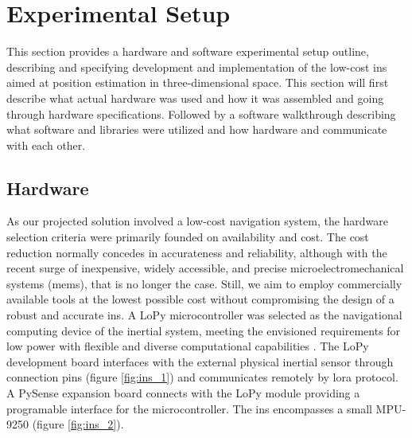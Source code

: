 \section{Experimental Setup}

This section provides a hardware and software experimental setup outline, describing and specifying development and implementation of the low-cost \acrfull{ins} aimed at position estimation in three-dimensional space. This section will first describe what actual hardware was used and how it was assembled and going through hardware specifications. Followed by a software walkthrough describing what software and libraries were utilized and how hardware and communicate with each other.

\subsection{Hardware}
\label{sub:setup}

As our projected solution involved a low-cost navigation system, the hardware selection criteria were primarily founded on availability and cost. The cost reduction normally concedes in accurateness and reliability, although with the recent surge of inexpensive, widely accessible, and precise microelectromechanical systems (\acrshort{mems}), that is no longer the case. Still, we aim to employ commercially available tools at the lowest possible cost without compromising the design of a robust and accurate \acrfull{ins}. A LoPy microcontroller was selected as the navigational computing device of the inertial system, meeting the envisioned requirements for low power with flexible and diverse computational capabilities \cite{lopy}. The LoPy development board interfaces with the external physical inertial sensor through connection pins (figure \ref{fig:ins_1}) and communicates remotely by \acrfull{lora} protocol. A PySense expansion board connects with the LoPy module providing a programable interface for the microcontroller. The \acrfull{ins} encompasses a small MPU-9250 (figure \ref{fig:ins_2}).

